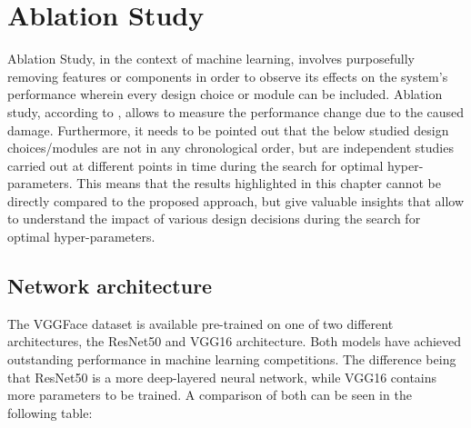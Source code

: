 \section{Ablation Study}
Ablation Study, in the context of machine learning, involves purposefully removing features or components in order to observe its effects on the system's performance wherein every design choice or module can be included. Ablation study, according to \citet{Fadelli:2018:AblationInANN}, allows to measure the performance change due to the caused damage.
\newline\newline
Furthermore, it needs to be pointed out that the below studied design choices/modules are not in any chronological order, but are independent studies carried out at different points in time during the search for optimal hyper-parameters. This means that the results highlighted in this chapter cannot be directly compared to the proposed approach, but give valuable insights that allow to understand the impact of various design decisions during the search for optimal hyper-parameters.

\subsection{Network architecture}
The VGGFace dataset is available pre-trained on one of two different architectures, the ResNet50 and VGG16 architecture. Both models have achieved outstanding performance in machine learning competitions. The difference being that ResNet50 is a more deep-layered neural network, while VGG16 contains more parameters to be trained. A comparison of both can be seen in the following table:

